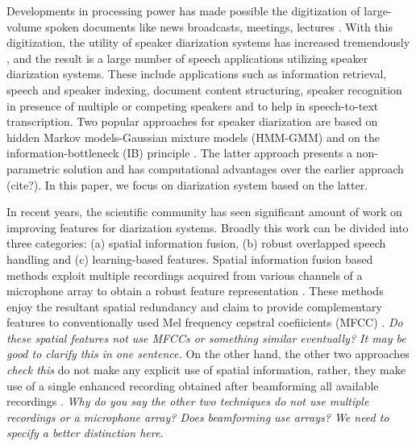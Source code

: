 \documentclass[conference]{IEEEtran}
\begin{document}
Developments in processing power has made possible the digitization of
large-volume spoken documents like news broadcasts, meetings, lectures 
\cite{reviewPaper2,reviewPaper3}. With this digitization, the utility of speaker
diarization systems has increased tremendously \cite{reviewPaper1,reviewPaper4},
and the result is a large number of speech applications utilizing speaker
diarization systems. These include applications such as information retrieval, 
speech and speaker indexing,
document content structuring, speaker recognition in presence of multiple or
competing speakers and to help in speech-to-text transcription. Two popular
approaches for speaker diarization are based on hidden Markov models-Gaussian
mixture models (HMM-GMM) \cite{reviewPaper1} and on
the information-bottleneck (IB) principle \cite{aIB2}. The latter approach
presents a non-parametric solution and has computational advantages over the
earlier approach (cite?). In this paper, we focus on diarization system based on the
latter.

In recent years, the scientific community has seen significant amount of work on
improving features for diarization systems. Broadly this work can be divided
into three categories: (a) spatial information fusion, (b) 
robust overlapped speech handling and (c) learning-based features. Spatial
information fusion based methods exploit multiple recordings acquired from
various channels of a microphone array to obtain a robust feature representation
\cite{aIB3,aIB4,featAngle,speakerUPM,featSpatial,MDM}. These methods enjoy the
resultant spatial redundancy and claim to provide complementary features to
conventionally used Mel frequency cepstral coefiicients (MFCC) \cite{MDM}.
\textit{Do these spatial features not use MFCCs or something similar
eventually? It may be good to clarify this in one sentence.}
On the other hand, the other two approaches \textit{check this} do not make any explicit use of spatial 
information, rather, they make use of a single enhanced recording obtained
after beamforming all available recordings \cite{beamforming}.
\textit{Why do you say the other two techniques do not use multiple recordings
or a microphone array? Does beamforming use arrays? We need to specify a better
distinction here.} 
\end{document}
